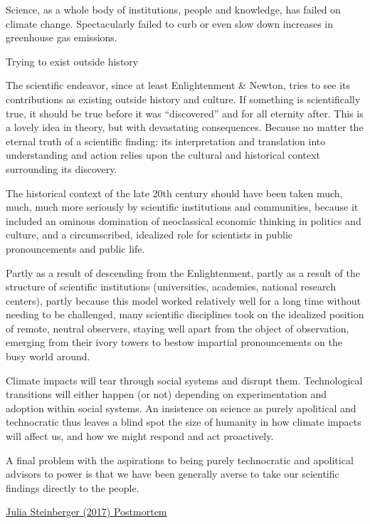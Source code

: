 \documentclass[
]{book}
\begin{document}
Science, as a whole body of institutions, people and knowledge, has failed on climate change.
Spectacularly failed to curb or even slow down increases in greenhouse gas emissions.

Trying to exist outside history

The scientific endeavor, since at least Enlightenment \& Newton, tries to see its contributions as existing outside history and culture. If something is scientifically true, it should be true before it was ``discovered'' and for all eternity after. This is a lovely idea in theory, but with devastating consequences. Because no matter the eternal truth of a scientific finding: its interpretation and translation into understanding and action relies upon the cultural and historical context surrounding its discovery.

The historical context of the late 20th century should have been taken much, much, much more seriously by scientific institutions and communities, because it included an ominous domination of neoclassical economic thinking in politics and culture, and a circumscribed, idealized role for scientists in public pronouncements and public life.

Partly as a result of descending from the Enlightenment, partly as a result of the structure of scientific institutions (universities, academies, national research centers), partly because this model worked relatively well for a long time without needing to be challenged, many scientific disciplines took on the idealized position of remote, neutral observers, staying well apart from the object of observation, emerging from their ivory towers to bestow impartial pronouncements on the busy world around.

Climate impacts will tear through social systems and disrupt them. Technological transitions will either happen (or not) depending on experimentation and adoption within social systems. An insistence on science as purely apolitical and technocratic thus leaves a blind spot the size of humanity in how climate impacts will affect us, and how we might respond and act proactively.

A final problem with the aspirations to being purely technocratic and apolitical advisors to power is that we have been generally averse to take our scientific findings directly to the people.

\href{https://medium.com/age-of-awareness/a-postmortem-for-survival-on-science-failure-and-action-on-climate-change-35636c79971e}{Julia Steinberger (2017) Postmortem}
\end{document}
